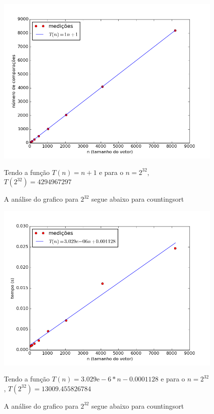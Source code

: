 \documentclass[12pt,a4paper,twoside]{report}
\begin{document}
\begin{figure}[ht]
\centering \includegraphics[scale=0.8]{../countingsort/imagens/countingsortQuaseCresc101.png}
\caption{A análise do grafico para $2^{32}$ segue abaixo para countingsort}

Tendo a função $T(n) = n+1 $ e para o $n =2^{32}$, $T(2^{32}) = 4294967297$ 
\label{fig:countingsortQuaseCresc101}
\end{figure}




\begin{figure}[ht]
\centering \includegraphics[scale=0.8]{../countingsort/imagens/countingsortQuaseCresc200.png}
\caption{A análise do grafico para $2^{32}$ segue abaixo para countingsort}

Tendo a função $T(n) = 3.029\mathrm{e}-6*n-0.0001128$ e para o $n =2^{32}$, $T(2^{32}) = 13009.455826784$ 
\label{fig:countingsortQuaseCresc200}
\end{figure}
\end{document}
